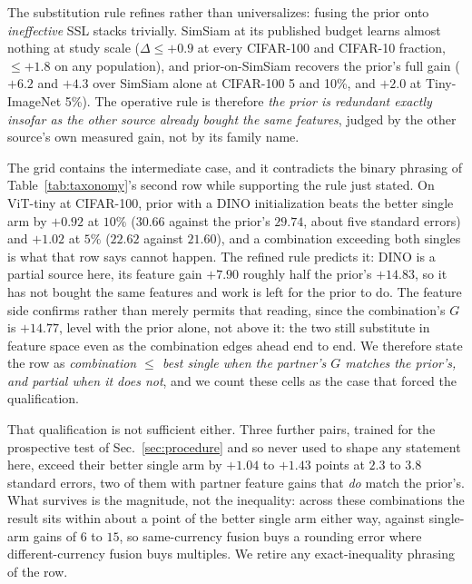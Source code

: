 The substitution rule refines rather than universalizes: fusing the prior onto
\emph{ineffective} SSL stacks trivially. SimSiam at its published
budget learns almost nothing at study scale ($\Delta \leq +0.9$ at every
CIFAR-100 and CIFAR-10 fraction, ${\leq}+1.8$ on any population), and
prior-on-SimSiam recovers the prior's full gain ($+6.2$ and $+4.3$ over
SimSiam alone at CIFAR-100 5 and 10\%, and $+2.0$ at Tiny-ImageNet 5\%). The operative rule is therefore \emph{the prior is
redundant exactly insofar as the other source already bought the same
features}, judged by the other source's own measured gain, not by its family
name.

 The grid contains the intermediate case, and it contradicts the binary phrasing
of Table~\ref{tab:taxonomy}'s second row while supporting the rule just stated.
On ViT-tiny at CIFAR-100, prior with a DINO initialization beats the better
single arm by $+0.92$ at $10\%$ ($30.66$ against the prior's $29.74$, about
five standard errors) and $+1.02$ at $5\%$ ($22.62$ against $21.60$), and a
combination exceeding both singles is what that row says cannot happen. The
refined rule predicts it: DINO is a partial source here, its feature gain
$+7.90$ roughly half the prior's $+14.83$, so it has not bought the same
features and work is left for the prior to do. The feature side confirms rather
than merely permits that reading, since the combination's $G$ is $+14.77$,
level with the prior alone, not above it: the two still substitute in
feature space even as the combination edges ahead end to end. We therefore state the row as \emph{combination $\leq$ best
single when the partner's $G$ matches the prior's, and partial when it does
not}, and we count these cells as the case that forced the qualification.

That qualification is not sufficient either. Three further pairs, trained for
the prospective test of Sec.~\ref{sec:procedure} and so never used to shape any
statement here, exceed their better single arm by $+1.04$ to $+1.43$ points at
$2.3$ to $3.8$ standard errors, two of them with partner feature gains that
\emph{do} match the prior's. What survives is the magnitude, not the
inequality: across these combinations the result sits within about a point of
the better single arm either way, against single-arm gains of $6$ to $15$, so
same-currency fusion buys a rounding error where different-currency fusion buys
multiples. We retire any exact-inequality phrasing of the row.

